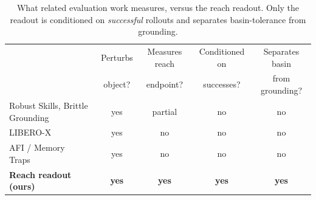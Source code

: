 \begin{table}[t]
\centering
\small
\caption{What related evaluation work measures, versus the reach readout. Only the readout
is conditioned on \emph{successful} rollouts and separates basin-tolerance from grounding.}
\label{tab:delta}
\begin{tabular}{lcccc}
\toprule
 & Perturbs & Measures reach & Conditioned on & Separates basin \\
 & object? & endpoint? & successes? & from grounding? \\
\midrule
Robust Skills, Brittle Grounding~\citep{robustskills2026} & yes & partial & no & no \\
LIBERO-X~\citep{liberox2026} & yes & no & no & no \\
AFI / Memory Traps~\citep{afi2025memory} & yes & no & no & no \\
\textbf{Reach readout (ours)} & \textbf{yes} & \textbf{yes} & \textbf{yes} & \textbf{yes} \\
\bottomrule
\end{tabular}
\end{table}
